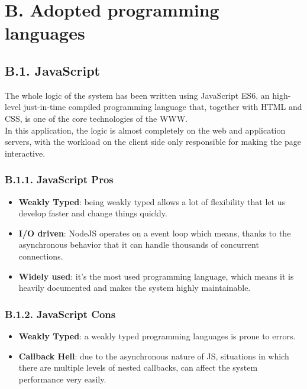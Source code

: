 \section{B. Adopted programming languages}

\subsection{B.1. JavaScript}

The whole logic of the system has been written using JavaScript ES6, an high-level just-in-time compiled programming language that, together with HTML and CSS, is one of the core technologies of the WWW.\\
In this application, the logic is almost completely on the web and application servers, with the workload on the client side only responsible for making the page interactive.

\subsubsection{B.1.1. JavaScript Pros}

\begin{itemize}
  \item \textbf{Weakly Typed}: being weakly typed allows a lot of flexibility that let us develop faster and change things quickly.
  \item \textbf{I/O driven}: NodeJS operates on a event loop which means, thanks to the asynchronous behavior that it can handle thousands of concurrent connections.
  \item \textbf{Widely used}: it's the most used programming language, which means it is heavily documented and makes the system highly maintainable.
\end{itemize}

\subsubsection{B.1.2. JavaScript Cons}

\begin{itemize}
  \item \textbf{Weakly Typed}: a weakly typed programming languages is prone to errors.
  \item \textbf{Callback Hell}: due to the asynchronous nature of JS, situations in which there are multiple levels of nested callbacks, can affect the system performance very easily.
\end{itemize}


